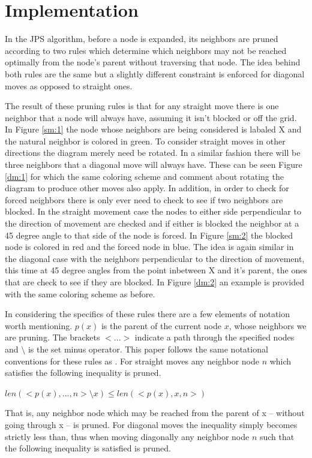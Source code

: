 \documentclass[12pt]{article}
\begin{document}
\section{Implementation}
In the JPS algorithm, before a node is expanded, its neighbors are pruned according to two rules which determine which neighbors may not be reached
optimally from the node's parent without traversing that node. The idea behind both rules are the same but a slightly different constraint is enforced
for diagonal moves as opposed to straight ones. 

The result of these pruning rules is that for any straight move there is one neighbor that a node will always have, assuming it isn't blocked or 
off the grid. In Figure \ref{sm:1} the node whose neighbors are being considered is labaled X and the natural neighbor is colored in green. To consider 
straight moves in other directions the diagram merely need be rotated. In a similar fashion there will be three neighbors that a diagonal move will always 
have. These can be seen Figure \ref{dm:1} for which the same coloring scheme and comment about rotating the diagram to produce other moves also apply. 
In addition, in order to check for forced neighbors there is only ever need to check to see if two neighbors are blocked. In the straight movement case
the nodes to either side perpendicular to the direction of movement are checked and if either is blocked the neighbor at a 45 degree angle to that side
of the node is forced. In Figure \ref{sm:2} the blocked node is colored in red and the forced node in blue. The idea is again similar in the diagonal case 
with the neighbors perpendicular to the direction of movement, this time at 45 degree angles from the point inbetween X and it's parent, the ones that are
check to see if they are blocked. In Figure \ref{dm:2} an example is provided with the same coloring scheme as before.

In considering the specifics of these rules there are a few elements of notation worth mentioning. $p(x)$ is the parent of the current node $x$, 
whose neighbors we are pruning. The brackets $<...>$ indicate a path through the specified nodes and $\setminus$ is the set minus operator. This paper
follows the same notational conventions for these rules as \cite{Har2011}.
For straight moves any neighbor node $n$ which satisfies the following inequality is pruned.

$len( <p(x),...,n> \setminus x ) \le len( <p(x),x,n> )$

That is, any neighbor node which may be reached from the parent of x -- without going through x -- is pruned. For diagonal moves the inequality simply
becomes strictly less than, thus when moving diagonally any neighbor node $n$ such that the following inequality is satisfied is pruned.
\end{document}
